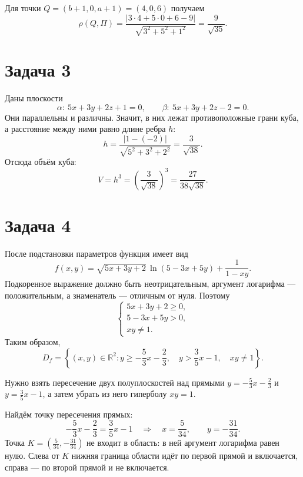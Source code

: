 \documentclass[12pt,a4paper]{article}
\newcommand{\R}{\mathbb R}
\newcommand{\task}[1]{\section*{Задача #1}}
\begin{document}
Для точки $Q=(b+1,0,a+1)=(4,0,6)$ получаем
\[
\rho(Q,\Pi)=\frac{|3\cdot4+5\cdot0+6-9|}{\sqrt{3^2+5^2+1^2}}
=\boxed{\frac{9}{\sqrt{35}}}.
\]

\task{3}
Даны плоскости
\[
\alpha:\ 5x+3y+2z+1=0,\qquad
\beta:\ 5x+3y+2z-2=0.
\]
Они параллельны и различны. Значит, в них лежат противоположные
грани куба, а расстояние между ними равно длине ребра $h$:
\[
h=\frac{|1-(-2)|}{\sqrt{5^2+3^2+2^2}}=\frac{3}{\sqrt{38}}.
\]
Отсюда объём куба:
\[
\boxed{V=h^3=\left(\frac{3}{\sqrt{38}}\right)^3
=\frac{27}{38\sqrt{38}}.}
\]

\newpage
\task{4}
После подстановки параметров функция имеет вид
\[
f(x,y)=\sqrt{5x+3y+2}\,\ln(5-3x+5y)+\frac{1}{1-xy}.
\]
Подкоренное выражение должно быть неотрицательным, аргумент
логарифма --- положительным, а знаменатель --- отличным от нуля.
Поэтому
\[
\begin{cases}
5x+3y+2\geqslant0,\\
5-3x+5y>0,\\
xy\neq1.
\end{cases}
\]
Таким образом,
\[
\boxed{D_f=\left\{(x,y)\in\R^2:
 y\geqslant-\frac53x-\frac23,\quad
 y>\frac35x-1,\quad xy\neq1\right\}.}
\]

Нужно взять пересечение двух полуплоскостей над прямыми
$y=-\frac53x-\frac23$ и $y=\frac35x-1$, а затем убрать
из него гиперболу $xy=1$.

Найдём точку пересечения прямых:
\[
-\frac53x-\frac23=\frac35x-1
\quad\Longrightarrow\quad
x=\frac5{34},\qquad y=-\frac{31}{34}.
\]
Точка $K=\left(\frac5{34},-\frac{31}{34}\right)$ не входит в область:
в ней аргумент логарифма равен нулю. Слева от $K$ нижняя граница
области идёт по первой прямой и включается, справа --- по второй
прямой и не включается.
\end{document}

